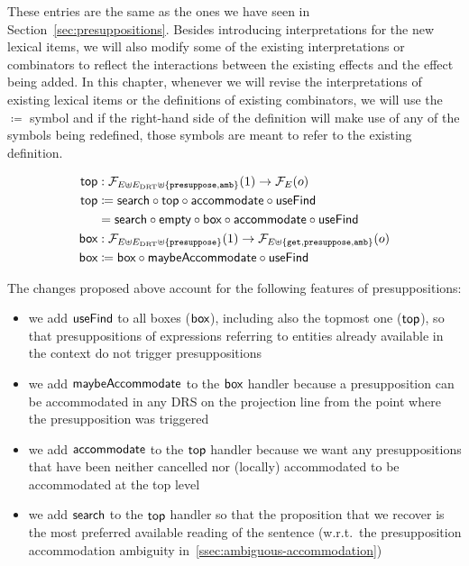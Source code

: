 These entries are the same as the ones we have seen in
Section~\ref{sec:presuppositions}. Besides introducing interpretations for
the new lexical items, we will also modify some of the existing
interpretations or combinators to reflect the interactions between the
existing effects and the effect being added. In this chapter, whenever we
will revise the interpretations of existing lexical items or the
definitions of existing combinators, we will use the $\coloneqq$ symbol and
if the right-hand side of the definition will make use of any of the
symbols being redefined, those symbols are meant to refer to the existing
definition.

\begin{align*}
  \textsf{top} &: \mathcal{F}_{E \uplus E_{\mathrm{DRT}} \uplus \{\mathtt{presuppose}, \mathtt{amb}\}}(1) \to \mathcal{F}_{E}(o) \\
  \textsf{top} &\coloneqq \textsf{search} \mathbin{\circ} \textsf{top} \mathbin{\circ} \textsf{accommodate} \mathbin{\circ} \textsf{useFind} \\
       &= \textsf{search} \mathbin{\circ} \textsf{empty} \mathbin{\circ} \textsf{box} \mathbin{\circ} \textsf{accommodate} \mathbin{\circ} \textsf{useFind} \\
  \textsf{box} &: \mathcal{F}_{E \uplus E_{\mathrm{DRT}} \uplus \{\mathtt{presuppose}\}}(1) \to \mathcal{F}_{E \uplus \{\mathtt{get}, \mathtt{presuppose}, \mathtt{amb}\}}(o) \\
  \textsf{box} &\coloneqq \textsf{box} \mathbin{\circ} \textsf{maybeAccommodate} \mathbin{\circ} \textsf{useFind} \\
\end{align*}

The changes proposed above account for the following features of
presuppositions:

\begin{itemize}
\item we add $\textsf{useFind}$ to all boxes ($\textsf{box}$), including also the topmost
  one ($\textsf{top}$), so that presuppositions of expressions referring to
  entities already available in the context do not trigger presuppositions
\item we add $\textsf{maybeAccommodate}$ to the $\textsf{box}$ handler because a
  presupposition can be accommodated in any DRS on the projection line from
  the point where the presupposition was triggered
\item we add $\textsf{accommodate}$ to the $\textsf{top}$ handler because we want any
  presuppositions that have been neither cancelled nor (locally)
  accommodated to be accommodated at the top level
\item we add $\textsf{search}$ to the $\textsf{top}$ handler so that the proposition that
  we recover is the most preferred available reading of the sentence
  (w.r.t.\ the presupposition accommodation ambiguity
  in~\ref{ssec:ambiguous-accommodation})
\end{itemize}

